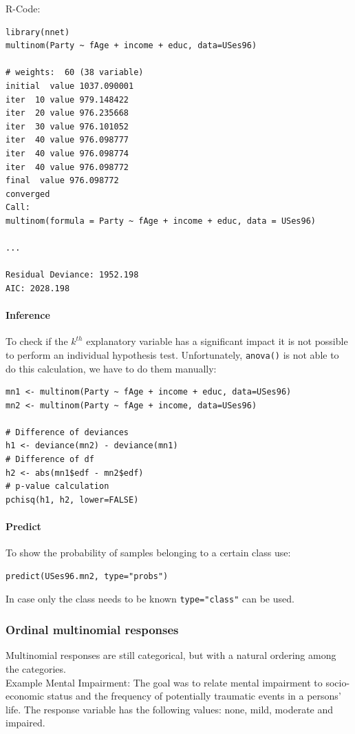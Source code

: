 R-Code:
\begin{lstlisting}
library(nnet)
multinom(Party ~ fAge + income + educ, data=USes96)

# weights:  60 (38 variable)
initial  value 1037.090001 
iter  10 value 979.148422
iter  20 value 976.235668
iter  30 value 976.101052
iter  40 value 976.098777
iter  40 value 976.098774
iter  40 value 976.098772
final  value 976.098772 
converged
Call:
multinom(formula = Party ~ fAge + income + educ, data = USes96)

...

Residual Deviance: 1952.198 
AIC: 2028.198 
\end{lstlisting}

\paragraph{Inference}
To check if the $k^{th}$ explanatory variable has a significant impact it is not possible to perform an individual hypothesis test. Unfortunately, \lstinline{anova()} is not able to do this calculation, we have to do them manually:
\begin{lstlisting}
mn1 <- multinom(Party ~ fAge + income + educ, data=USes96)
mn2 <- multinom(Party ~ fAge + income, data=USes96)

# Difference of deviances
h1 <- deviance(mn2) - deviance(mn1)
# Difference of df
h2 <- abs(mn1$edf - mn2$edf)
# p-value calculation
pchisq(h1, h2, lower=FALSE)
\end{lstlisting}

\paragraph{Predict}
To show the probability of samples belonging to a certain class use:
\begin{lstlisting}
predict(USes96.mn2, type="probs")
\end{lstlisting}
In case only the class needs to be known \lstinline{type="class"} can be used.

\subsubsection{Ordinal multinomial responses}
Multinomial responses are still categorical, but with a natural ordering among the categories.\\
Example Mental Impairment: The goal was to relate mental impairment to socio-economic status and the frequency of potentially traumatic events in a persons’ life. The response variable has the following values: none, mild, moderate and impaired.

